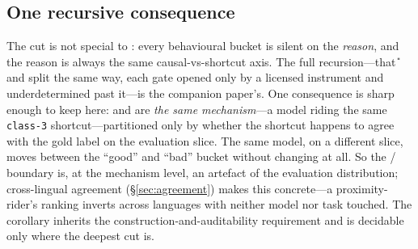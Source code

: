 \subsection{One recursive consequence}\label{sec:recursive}
The cut is not special to \SC{}: every behavioural bucket is silent on the
\emph{reason}, and the reason is always the same causal-vs-shortcut axis. The
full recursion---that \U{} and \SW{} split the same way, each gate opened only by
a licensed instrument and underdetermined past it---is the companion paper's. One
consequence is sharp enough to keep here: \scs{} and \swsc{} are \emph{the same
mechanism}---a model riding the same \texttt{class-3} shortcut---partitioned only
by whether the shortcut happens to agree with the gold label on the evaluation
slice. The same model, on a different slice, moves between the ``good'' and
``bad'' bucket without changing at all. So the \SC{}/\SW{} boundary is, at the
mechanism level, an artefact of the evaluation distribution; cross-lingual
agreement (\S\ref{sec:agreement}) makes this concrete---a proximity-rider's
ranking inverts across languages with neither model nor task touched. The
corollary inherits the construction-and-auditability requirement and is decidable
only where the deepest cut is.

